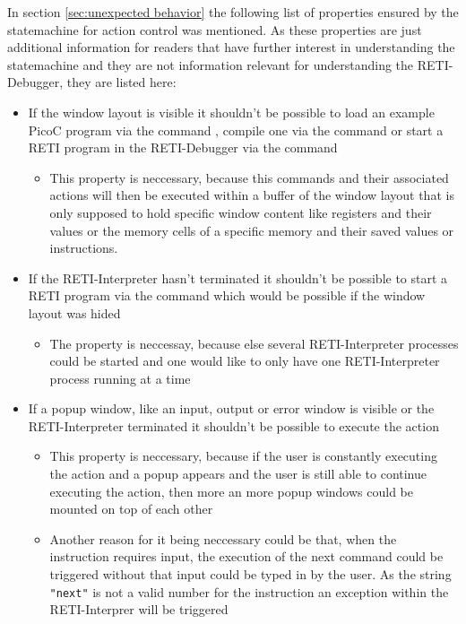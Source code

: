 \documentclass{report}
\begin{document}
In section \ref{sec:unexpected behavior} the following list of properties ensured by the statemachine for action control was mentioned. As these properties are just additional information for readers that have further interest in understanding the statemachine and they are not information relevant for understanding the RETI-Debugger, they are listed here:
\begin{itemize}
	\item If the window \alert{layout} is \alert{visible} it shouldn't be possible to load an example PicoC program via the command , compile one via the command  or start a RETI program in the RETI-Debugger via the command 
	\begin{itemize}
		\item This property is neccessary, because this commands and their associated actions will then be executed within a buffer of the window layout that is only supposed to hold specific window content like registers and their values or the memory cells of a specific memory and their saved values or instructions.
	\end{itemize}
	\item If the RETI-\alert{Interpreter hasn't terminated} it shouldn't be possible to start a RETI program via the command  which would be possible if the window layout was hided
	\begin{itemize}
		\item The property is neccessay, because else several RETI-Interpreter processes could be started and one would like to only have one RETI-Interpreter process running at a time
	\end{itemize}
	\item If a \alert{popup} window, like an input, output or error window is \alert{visible} or the RETI-\alert{Interpreter terminated} it shouldn't be possible to execute the  action
	\begin{itemize}
		\item This property is neccessary, because if the user is constantly executing the  action and a popup appears and the user is still able to continue executing the  action, then more an more popup windows could be mounted on top of each other
		\item Another reason for it being neccessary could be that, when the  instruction requires input, the execution of the next command could be triggered without that input could be typed in by the user. As the string \texttt{"next"} is not a valid number for the  instruction an exception within the RETI-Interprer will be triggered

\end{itemize}
\end{itemize}
\end{document}
